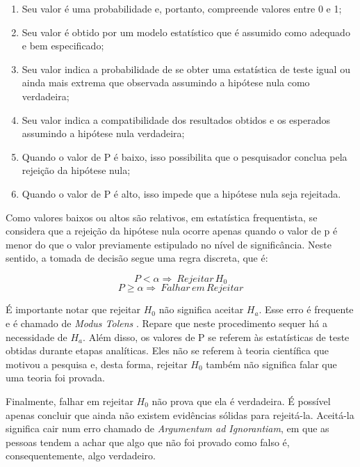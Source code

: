 \documentclass[
]{book}
\providecommand{\tightlist}{%
  \setlength{\itemsep}{0pt}\setlength{\parskip}{0pt}}
\begin{document}
\begin{enumerate}
\def\labelenumi{(\arabic{enumi})}
\tightlist
\item
  Seu valor é uma probabilidade e, portanto, compreende valores entre 0 e 1;\\
\item
  Seu valor é obtido por um modelo estatístico que é assumido como adequado e bem especificado;\\
\item
  Seu valor indica a probabilidade de se obter uma estatística de teste igual ou ainda mais extrema que observada assumindo a hipótese nula como verdadeira;\\
\item
  Seu valor indica a compatibilidade dos resultados obtidos e os esperados assumindo a hipótese nula verdadeira;\\
\item
  Quando o valor de P é baixo, isso possibilita que o pesquisador conclua pela rejeição da hipótese nula;\\
\item
  Quando o valor de P é alto, isso impede que a hipótese nula seja rejeitada.
\end{enumerate}

Como valores baixos ou altos são relativos, em estatística frequentista, se considera que a rejeição da hipótese nula ocorre apenas quando o valor de p é menor do que o valor previamente estipulado no nível de significância. Neste sentido, a tomada de decisão segue uma regra discreta, que é:

\[P<\alpha \Rightarrow \ Rejeitar \, H_0 \]
\[P     \geq \alpha \Rightarrow \ Falhar \,em \,Rejeitar \]

É importante notar que rejeitar \(H_0\) não significa aceitar \(H_a\). Esse erro é frequente e é chamado de \emph{Modus Tolens} \citep{Trafimow2019}. Repare que neste procedimento sequer há a necessidade de \(H_a\). Além disso, os valores de P se referem às estatísticas de teste obtidas durante etapas analíticas. Eles não se referem à teoria científica que motivou a pesquisa e, desta forma, rejeitar \(H_0\) também não significa falar que uma teoria foi provada.

Finalmente, falhar em rejeitar \(H_0\) não prova que ela é verdadeira. É possível apenas concluir que ainda não existem evidências sólidas para rejeitá-la. Aceitá-la significa cair num erro chamado de \emph{Argumentum ad Ignorantiam}, em que as pessoas tendem a achar que algo que não foi provado como falso é, consequentemente, algo verdadeiro.
\end{document}
